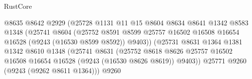 \begin{lexlean}{RustCore}
\begin{coremodule}
                                          @8635
                                          @8642
                                          @2929
                                          (@25728
                                            @1131
                                            @11
                                            @15
                                            @8604
                                            @8634
                                            @8641
                                            @1342
                                            @8583
                                            @1348
                                            (@25741
                                              @8604
                                              (@25752
                                                @8591
                                                @8599
                                                @25757
                                                @16502
                                                @16508
                                                @16654
                                                @16528
                                                (@9243 (@16530 @8599 @8592))
                                                @9403))
                                            (@25731
                                              @8631
                                              @1364
                                              @1381
                                              @1342
                                              @8610
                                              @1348
                                              (@25741
                                                @8631
                                                (@25752
                                                  @8618
                                                  @8626
                                                  @25757
                                                  @16502
                                                  @16508
                                                  @16654
                                                  @16528
                                                  (@9243 (@16530 @8626 @8619))
                                                  @9403))
                                              @25771
                                              @9260
                                              (@9243 (@9262 @8611 @1364)))
                                            @9260

\end{coremodule}
\end{lexlean}
